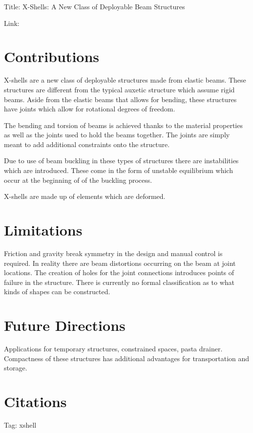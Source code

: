 \documentclass{article}
\begin{document}
    
Title: X-Shells: A New Class of Deployable Beam Structures

Link: 

\section*{Contributions}
X-shells are a new class of deployable structures made from elastic beams. These
structures are different from the typical auxetic structure which assume rigid beams.
Aside from the elastic beams that allows for bending, these structures have joints which
allow for rotational degrees of freedom. 

The bending and torsion of beams is achieved thanks to the material properties as well 
as the joints used to hold the beams together. The joints are simply meant to add 
additional constraints onto the structure. 

Due to use of beam buckling in these types of structures there are instabilities which 
are introduced. These come in the form of unstable equilibrium which occur at the 
beginning of of the buckling process. 

X-shells are made up of elements which are deformed. 

\section*{Limitations}
Friction and gravity break symmetry in the design and manual control is required. 
In reality there are beam distortions occurring on the beam at joint locations. The 
creation of holes for the joint connections introduces points of failure in the structure. 
There is currently no formal classification as to what kinds of shapes can be constructed. 


\section*{Future Directions}
Applications for temporary structures, constrained spaces, pasta drainer. 
Compactness of these structures has additional advantages for transportation and storage. 


\section*{Citations}


Tag: xshell
\cite{xshell}
\end{document}
